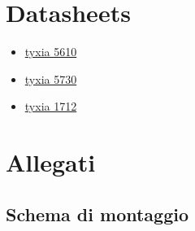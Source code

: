 \documentclass[12pt]{article}
\begin{document}
\section{Datasheets}
\begin{itemize}
    \item \href{https://www.deltadore.fr/data/product_files/6351400/documents/notices/Install/fr/web_2704527_rev5_not_nano_TYXIA_5610_5612_FR-rev05.pdf}{tyxia 5610}
    \item \href{https://www.deltadore.fr/data/product_files/6351402/documents/notices/Install/fr/web_2704526_rev5_not_nano_TYXIA_5630_5730_FR-rev05.pdf}{tyxia 5730}
    \item \href{https://www.deltadore.fr/data/product_files/6351406/documents/notices/Install/fr/web_2704633_rev3_Telecommande_TYXIA_1712_FR-rev03.pdf}{tyxia 1712}
\end{itemize}
    \section{Allegati}
    \subsection{Schema di montaggio}
    
\end{document}
